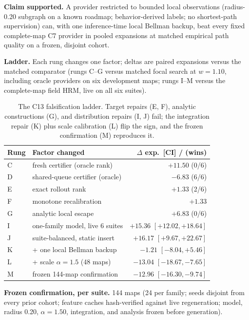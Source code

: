 \documentclass[letterpaper]{article} %
\newcommand{\stage}[1]{\textsc{#1}}
\begin{document}
\textbf{Claim supported.} A provider restricted to bounded local observations (radius-0.20 subgraph on a known roadmap; behavior-derived labels; no shortest-path supervision) can, with one inference-time local Bellman backup, beat every fixed complete-map \stage{C7} provider in pooled expansions at matched empirical path quality on a frozen, disjoint cohort.

\textbf{Ladder.} Each rung changes one factor; deltas are paired expansions versus the matched comparator (rungs C--G versus matched focal search at $w{=}1.10$, including oracle providers on six development maps; rungs I--M versus the complete-map field HRM, live on all six suites).

\begin{table}[t]
\centering
\small
\setlength{\tabcolsep}{1.5pt}
\begin{tabular}{@{}llr@{}}
\toprule
Rung & Factor changed & $\Delta$ exp.\ [CI] / (wins) \\
\midrule
C & fresh certifier (oracle rank) & $+11.50$ (0/6) \\
D & shared-queue certifier (oracle) & $-6.83$ (6/6) \\
E & exact rollout rank & $+1.33$ (2/6) \\
F & monotone recalibration & $+1.33$ \\
G & analytic local escape & $+6.83$ (0/6) \\
I & one-family model, live 6 suites & $+15.36$ $[+12.02,+18.64]$ \\
J & suite-balanced, static insert & $+16.17$ $[+9.67,+22.67]$ \\
K & + one local Bellman backup & $-1.21$ $[-8.04,+5.46]$ \\
L & + scale $\alpha{=}1.5$ (48 maps) & $-13.04$ $[-18.67,-7.65]$ \\
M & frozen 144-map confirmation & $-12.96$ $[-16.30,-9.74]$ \\
\bottomrule
\end{tabular}
\caption{The \stage{C13} falsification ladder. Target repairs (E, F), analytic constructions (G), and distribution repairs (I, J) fail; the integration repair (K) plus scale calibration (L) flip the sign, and the frozen confirmation (M) reproduces it.}
\label{tab:c13ladder}
\end{table}

\textbf{Frozen confirmation, per suite.} 144 maps (24 per family; seeds disjoint from every prior cohort; feature caches hash-verified against live regeneration; model, radius 0.20, $\alpha{=}1.50$, integration, and analysis frozen before generation).
\end{document}
